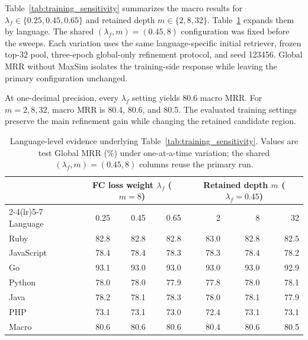 \documentclass[11pt]{article}
\begin{document}
Table~\ref{tab:training_sensitivity} summarizes the macro results for \(\lambda_f\in\{0.25,0.45,0.65\}\) and retained depth \(m\in\{2,8,32\}\). Table~\ref{tab:parameter_sensitivity} expands them by language. The shared \((\lambda_f,m)=(0.45,8)\) configuration was fixed before the sweeps. Each variation uses the same language-specific initial retriever, frozen top-32 pool, three-epoch global-only refinement protocol, and seed 123456. Global MRR without MaxSim isolates the training-side response while leaving the primary configuration unchanged.

At one-decimal precision, every \(\lambda_f\) setting yields 80.6 macro MRR. For \(m=2,8,32\), macro MRR is 80.4, 80.6, and 80.5. The evaluated training settings preserve the main refinement gain while changing the retained candidate region.

\begin{table}[!t]
  \centering
  \small
  \setlength{\tabcolsep}{8.0pt}
  \begin{tabular}{lrrr@{\hspace{1.2em}}rrr}
    \toprule
    & \multicolumn{3}{c}{FC loss weight \(\lambda_f\) (\(m=8\))}
    & \multicolumn{3}{c}{Retained depth \(m\) (\(\lambda_f=0.45\))} \\
    \cmidrule(lr){2-4}\cmidrule(lr){5-7}
    Language & 0.25 & 0.45 & 0.65 & 2 & 8 & 32 \\
    \midrule
    Ruby       & 82.8 & 82.8 & 82.8 & 83.0 & 82.8 & 82.5 \\
    JavaScript & 78.4 & 78.4 & 78.3 & 78.3 & 78.4 & 78.2 \\
    Go         & 93.1 & 93.0 & 93.0 & 93.0 & 93.0 & 92.9 \\
    Python     & 78.0 & 78.0 & 77.9 & 77.8 & 78.0 & 78.1 \\
    Java       & 78.2 & 78.1 & 78.3 & 78.0 & 78.1 & 77.9 \\
    PHP        & 73.1 & 73.1 & 73.0 & 72.4 & 73.1 & 73.1 \\
    \midrule
    Macro      & 80.6 & 80.6 & 80.6 & 80.4 & 80.6 & 80.5 \\
    \bottomrule
  \end{tabular}
  \caption{Language-level evidence underlying Table~\ref{tab:training_sensitivity}. Values are test Global MRR (\%) under one-at-a-time variation; the shared \((\lambda_f,m)=(0.45,8)\) columns reuse the primary run.}
  \label{tab:parameter_sensitivity}
\end{table}
\end{document}
